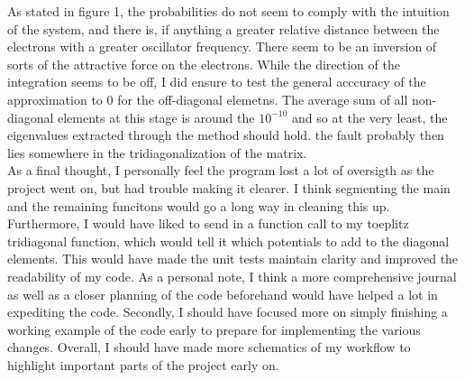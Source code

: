 \documentclass[10pt, twocolumn]{article}
\begin{document}
As stated in figure 1, the probabilities do not seem to comply with the intuition of the system, and there is, if anything a greater relative
distance between the electrons with a greater oscillator frequency. There seem to be an inversion of sorts of the attractive force on the
electrons. While the direction of the integration seems to be off, I did ensure to test the general acccuracy of the approximation to 0
for the off-diagonal elemetns. The average sum of all non-diagonal elements at this stage is around the $10^{-10}$ and so at the very least,
the eigenvalues extracted through the method should hold. the fault probably then lies somewhere in the tridiagonalization of the matrix. \\

As a final thought, I personally feel the program lost a lot of oversigth as the project went on, but had trouble making it clearer. I think segmenting 
the main and the remaining funcitons would go a long way in cleaning this up. Furthermore, I would have liked to send in a function call to 
my toeplitz tridiagonal function, which would tell it which potentials to add to the diagonal elements. This would have made the unit 
tests maintain clarity and improved the readability of my code. As a personal note, I think a more comprehensive journal as well as a 
closer planning of the code beforehand would have helped a lot in expediting the code. Secondly, I should have focused more on simply 
finishing a working example of the code early to prepare for implementing the various changes. Overall, I should have made more 
schematics of my workflow to highlight important parts of the project early on.



\end{document}
